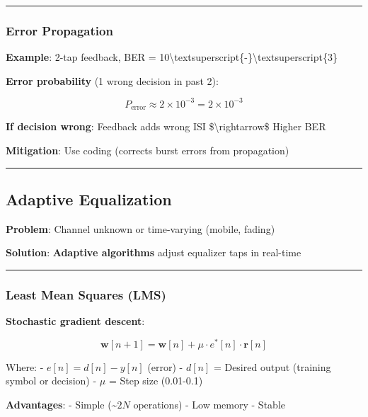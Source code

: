 \begin{center}\rule{0.5\linewidth}{0.5pt}\end{center}

\subsubsection{Error Propagation}\label{error-propagation}

\textbf{Example}: 2-tap feedback, BER =
10\textbackslash textsuperscript\{-\}\textbackslash textsuperscript\{3\}

\textbf{Error probability} (1 wrong decision in past 2):

\[
P_{\text{error}} \approx 2 \times 10^{-3} = 2 \times 10^{-3}
\]

\textbf{If decision wrong}: Feedback adds wrong ISI
\$\textbackslash rightarrow\$ Higher BER

\textbf{Mitigation}: Use coding (corrects burst errors from propagation)

\begin{center}\rule{0.5\linewidth}{0.5pt}\end{center}

\subsection{Adaptive Equalization}\label{adaptive-equalization}

\textbf{Problem}: Channel unknown or time-varying (mobile, fading)

\textbf{Solution}: \textbf{Adaptive algorithms} adjust equalizer taps in
real-time

\begin{center}\rule{0.5\linewidth}{0.5pt}\end{center}

\subsubsection{Least Mean Squares (LMS)}\label{least-mean-squares-lms}

\textbf{Stochastic gradient descent}:

\[
\mathbf{w}[n+1] = \mathbf{w}[n] + \mu \cdot e^*[n] \cdot \mathbf{r}[n]
\]

Where: - \(e[n] = d[n] - y[n]\) (error) - \(d[n]\) = Desired output
(training symbol or decision) - \(\mu\) = Step size (0.01-0.1)

\textbf{Advantages}: - Simple (\textasciitilde{}\(2N\) operations) - Low
memory - Stable

